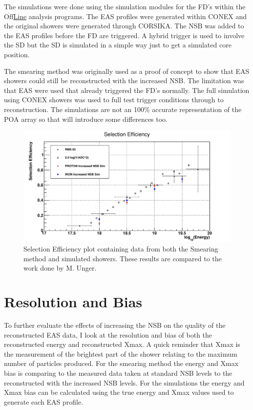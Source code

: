 The simulations were done using the simulation modules for the FD's within the $\overline{\mathrm{Off}}$\underline{Line} analysis programs. The EAS profiles were generated within CONEX and the original showers were generated through CORSIKA. The NSB was added to the EAS profiles before the FD are triggered. A hybrid trigger is used to involve the SD but the SD is simulated in a simple way just to get a simulated core position.

The smearing method was originally used as a proof of concept to show that EAS showers could still be reconstructed with the increased NSB. The limitation was that EAS were used that already triggered the FD's normally. The full simulation using CONEX showers was used to full test trigger conditions through to reconstruction. The simulations are not an 100\% accurate representation of the POA array so that will introduce some differences too.


\begin{figure}[!hp]
\centering
\includegraphics[width=\textwidth]{chapters/graphs/SelectionEff/SelectionEff_errorbars_10timesNSB.pdf}
\caption{Selection Efficiency plot containing data from both the Smearing method and simulated showers. These results are compared to the work done by M. Unger.}
\end{figure}

\section{Resolution and Bias}

To further evaluate the effects of increasing the NSB on the quality of the reconstructed EAS data, I look at the resolution and bias of both the reconstructed energy and reconstructed Xmax. A quick reminder that Xmax is the measurement of the brightest part of the shower relating to the maximum number of particles produced. For the smearing method the energy and Xmax bias is comparing to the measured data taken at standard NSB levels to the reconstructed with the increased NSB levels. For the simulations the energy and Xmax bias can be calculated using the true energy and Xmax values used to generate each EAS profile.

